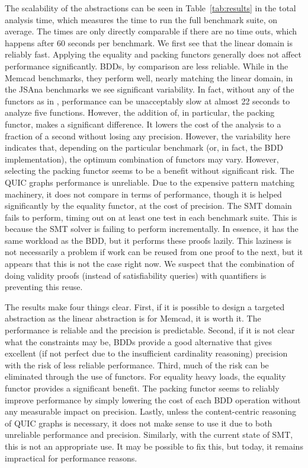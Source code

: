 The scalability of the abstractions can be seen in Table~\ref{tab:results} in the total analysis time, which measures the time to run the full benchmark suite, on average.  The times are only directly comparable if there are no time outs, which happens after 60 seconds per benchmark.  We first see that the linear domain is reliably fast.  Applying the equality and packing functors generally does not affect performance significantly.  BDDs, by comparison are less reliable.  While in the Memcad benchmarks, they perform well, nearly matching the linear domain, in the JSAna benchmarks we see significant variability.  In fact, without any of the functors as in \cite{ab:ecoop:13}, performance can be unacceptably slow at almost 22 seconds to analyze five functions.  However, the addition of, in particular, the packing functor, makes a significant difference.  It lowers the cost of the analysis to a fraction of a second without losing any precision.  However, the variability here indicates that, depending on the particular benchmark (or, in fact, the BDD implementation), the optimum combination of functors may vary.  However, selecting the packing functor seems to be a benefit without significant risk.  The QUIC graphs performance is unreliable.  Due to the expensive pattern matching machinery, it does not compare in terms of performance, though it is helped significantly by the equality functor, at the cost of precision.  The SMT domain fails to perform, timing out on at least one test in each benchmark suite.  This is because the SMT solver is failing to perform incrementally.  In essence, it has the same workload as the BDD, but it performs these proofs lazily.  This laziness is not necessarily a problem if work can be reused from one proof to the next, but it appears that this is not the case right now.  We suspect that the combination of doing validity proofs (instead of satisfiability queries) with quantifiers is preventing this reuse.

The results make four things clear.
First, if it is possible to design a targeted abstraction as the linear
abstraction is for Memcad, it is worth it.
The performance is reliable and the precision is predictable.
Second, if it is not clear what the constraints may be, BDDs provide a
good alternative that gives excellent (if not perfect due to the
insufficient cardinality reasoning) precision with the risk of less
reliable performance.
Third, much of the risk can be eliminated through the use of functors.  For equality heavy loads, the equality functor provides a significant benefit.  The packing functor seems to reliably improve performance by simply lowering the cost of each BDD operation without any measurable impact on precision.  Lastly, unless the content-centric reasoning of QUIC graphs is necessary, it does not make sense to use it due to both unreliable performance and precision.  Similarly, with the current state of SMT, this is not an appropriate use.  It may be possible to fix this, but today, it remains impractical for performance reasons.






